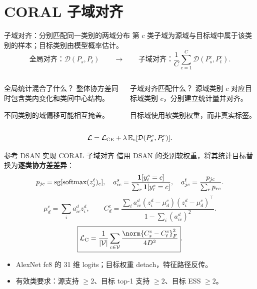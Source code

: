 \section{CORAL 子域对齐}

\begin{frame}[t]{子域对齐：分别匹配同一类别的两域分布}
\small
第 $c$ 类子域为源域与目标域中属于该类别的样本；目标类别由模型概率估计。
\[
\text{全局对齐：}\mathcal D(P_s,P_t)
\qquad\longrightarrow\qquad
\text{子域对齐：}\frac1C\sum_{c=1}^{C}\mathcal D(P_s^c,P_t^c).
\]
\begin{columns}[T,onlytextwidth]
\begin{block}{全局统计混合了什么？}
整体协方差同时包含类内变化和类间中心结构。\par
不同类别的域偏移可能相互掩盖。
\end{block}
\begin{block}{子域对齐匹配什么？}
源域类别 $c$ 对应目标域类别 $c$，分别建立统计量并对齐。\par
目标域使用软类别权重，而非真实标签。
\end{block}
\end{columns}
\[
\mathcal L=\mathcal L_{\mathrm{CE}}+\lambda\,\mathbb E_c[\mathcal D(P_s^c,P_t^c)].
\]
\end{frame}

\begin{frame}[t]{参考 DSAN 实现 CORAL 子域对齐}
\small
借用 DSAN 的类别软权重，将其统计目标替换为\textbf{逐类协方差差异}：
\[
p_{jc}=\operatorname{sg}[\operatorname{softmax}(z_j^t)_c],\quad
a^s_{ic}=\frac{\mathbf1[y_i^s=c]}{\sum_r\mathbf1[y_r^s=c]},\quad
a^t_{jc}=\frac{p_{jc}}{\sum_rp_{rc}}.
\]
\[
\mu_d^c=\sum_i a^d_{ic}z_i^d,\qquad
C_d^c=\frac{\sum_i a^d_{ic}(z_i^d-\mu_d^c)(z_i^d-\mu_d^c)^\top}{1-\sum_i(a^d_{ic})^2}.
\]
\[
\boxed{\LC=\frac1{|\mathcal V|}\sum_{c\in\mathcal V}\frac{\norm{C_s^c-C_t^c}_F^2}{4D^2}}.
\]
\begin{itemize}
  \item AlexNet fc8 的 31 维 logits；目标权重 detach，特征路径反传。
  \item 有效类要求：源支持 $\ge2$、目标 top-1 支持 $\ge2$、目标 ESS $\ge2$。
\end{itemize}
\end{frame}

